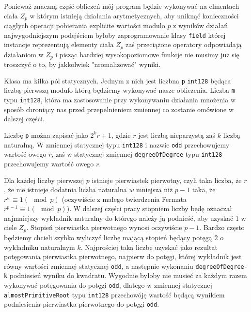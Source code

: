\documentclass{article}
\begin{document}
Ponieważ znaczną część obliczeń mój program będzie wykonywać na elmentach ciała
$Z_p$ w którym istnieją działania arytmetycznych, aby uniknąć konieczności ciągłych operacji pobierania explicite
wartości modulo $p$ z wyników działań najwygodniejszym podejściem byłoby zaprogramowanie klasy \texttt{field} której instancje
reprezentują elementy ciała $Z_p$ zaś przeciążone operatory odpowiadają działaniom w $Z_p$ i pisząc bardziej 
wysokopoziomowe funkcje nie musimy już się troszczyć o to, by jakkolwiek "nromalizować" wyniki. 


Klasa ma kilka pól statycznych. Jednym z nich jest liczbna \texttt{p} \texttt{\textunderscore \textunderscore int128}
będąca liczbą pierwszą modulo którą będziemy wykonywać nasze obliczenia. Liczba \texttt{m} typu 
\texttt{\textunderscore \textunderscore int128}, która ma zastosowanie przy wykonywaniu działania mnożenia w sposób
chroniący nas przed przepełnieniem zmiennej co zostanie omówione w dalszej części. 

Liczbę \texttt{p} można zapisać jako $2^kr+1$, gdzie $r$ jest liczbą nieparzystą zaś $k$ liczbą naturalną.
W zmiennej statycznej typu \texttt{\textunderscore \textunderscore int128} i nazwie \texttt{odd} przechowujemy
wartość owego $r$, zaś w statycznej zmiennej \texttt{degreeOfDegree} typu
\texttt{\textunderscore \textunderscore int128} przechowujemy wartość owego $r$.

Dla każdej liczby pierwszej $p$ istnieje pierwiastek pierwotny, czyli taka liczba, że $r$, że nie istnieje 
dodatnia liczba naturalna $w$ mniejsza niż $p-1$ taka, że $r^w \equiv 1 (\mod p)$ (oczywiście z małego twierdzenia
Fermata $r^{p-1} \equiv 1 (\mod p)$). W dalszej części pracy stopniem liczby będę oznaczał najmniejszy wykładnik
naturalny do którego należy ją podnieść, aby uzyskać $1$ w ciele $Z_p$. Stopień pierwiastka pierwotnego wynosi 
oczywiście $p-1$. Bardzo często będziemy chcieli szybko wyliczyć liczbę mającą stopień będący potęgą $2$ o 
wykładniku naturalnym $k$. Najprościej taką liczbę uzyskać jako rezultat potęgowania pierwiastka pierwotnego,
najpierw do potęgi, której wykładnik jest równy wartości zmiennej statycznej \texttt{odd}, a następnie
wykonaniu \texttt{degreeOfDegree-k}  podniesień wyniku do kwadratu. Wygodnie byłoby nie musieć za każdym razem
wykonywać potęgowania do potęgi \texttt{odd}, dlatego w zmiennej statycznej \texttt{almostPrimitiveRoot}
typu \texttt{\textunderscore \textunderscore int128} przechowóję wartość będącą wynikiem podniesienia pierwiastka
pierwotnego do potęgi \texttt{odd}.
\end{document}
